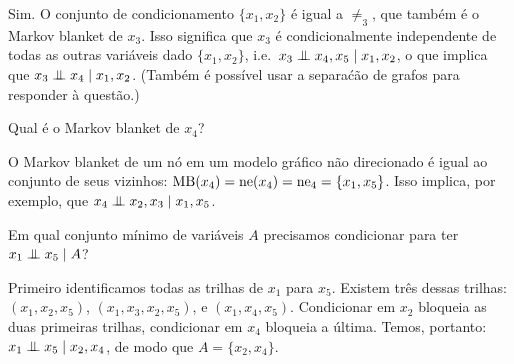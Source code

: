 \begin{exenumerate}
    \begin{solution}
        Sim. O conjunto de condicionamento $\{x_1,x_2\}$ \'e igual a $\ne_3$, que tamb\'em \'e o Markov blanket de $x_3$. Isso significa que $x_3$ \'e condicionalmente independente de todas as outras vari\'aveis dado $\{x_1,x_2\}$, i.e.\ $x_3 \mathrel{\perp\mspace{-10mu}\perp} x_4,x_5 \mid x_1, x_2$, o que implica que $x_3 \mathrel{\perp\mspace{-10mu}\perp} x_4 \mid x_1, x_2$. (Tamb\'em \'e poss\'ivel usar a separa\'c\~ao de grafos para responder \`a quest\~ao.)
    \end{solution}
    
    \item Qual \'e o Markov blanket de $x_4$?
    
    \begin{solution}
        O Markov blanket de um n\'o em um modelo gr\'afico n\~ao direcionado \'e igual ao conjunto de seus vizinhos: $\textrm{MB}(x_4) = \mathrm{ne}(x_4) = \mathrm{ne}_4 = \{x_1,x_5\}$. Isso implica, por exemplo, que
        $x_4 \mathrel{\perp\mspace{-10mu}\perp} x_2,x_3 \mid x_1,x_5$.
    \end{solution}
    
    \item Em qual conjunto m\'inimo de vari\'aveis $A$ precisamos condicionar para ter $x_1 \mathrel{\perp\mspace{-10mu}\perp} x_5 \mid A$?
    
    \begin{solution}
        Primeiro identificamos todas as trilhas de $x_1$ para $x_5$. Existem tr\^es dessas trilhas: $(x_1,x_2,x_5)$, $(x_1, x_3, x_2, x_5)$, e $(x_1,x_4, x_5)$. Condicionar em $x_2$ bloqueia as duas primeiras trilhas, condicionar em $x_4$ bloqueia a \'ultima. Temos, portanto: $x_1 \mathrel{\perp\mspace{-10mu}\perp} x_5 \mid x_2,x_4$, de modo que $A=\{x_2,x_4\}$.
    \end{solution}
    
\end{exenumerate}


